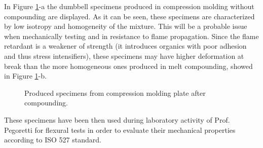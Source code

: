 \documentclass[a4paper, 11pt]{article}
\begin{document}
In Figure \ref{fig:spec}-a the dumbbell specimens produced in compression molding without compounding are displayed. As it can be seen, these specimens are characterized by low isotropy and homogeneity of the mixture. This will be a probable issue when mechanically testing and in resistance to flame propagation. Since the flame retardant is a weakener of strength (it introduces organics with poor adhesion and thus stress intensifiers), these specimens may have higher deformation at break than the more homogeneous ones produced in melt compounding, showed in Figure \ref{fig:spec}-b.
\begin{figure}[htp]
	\centering
	 \qquad
	\caption{Produced specimens from compression molding plate after compounding.}
	\label{fig:spec}
\end{figure}

These specimens have been then used during laboratory activity of Prof. Pegoretti for flexural tests in order to evaluate their mechanical properties according to ISO 527 standard.
\newpage
\end{document}
